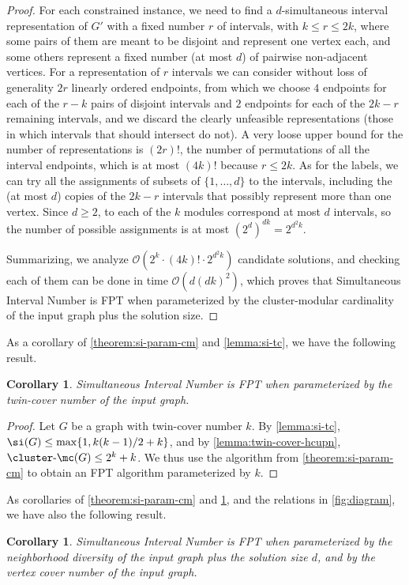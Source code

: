 \documentclass[11pt]{article}
\theoremstyle{plain}
\newtheorem{corollary}[theorem]{Corollary}
\theoremstyle{definition}
\theoremstyle{remark}
\renewcommand{\O}{\mathcal{O}}
\newcommand{\clustermc}{\text{$\cluster$-$\mc$}}
\newcommand{\cm}{\clustermc}
\newcommand{\FPT}{{\smaller[0.83]\textsf{\textup{FPT}}}\xspace}
\begin{document}
\begin{proof}
    For each constrained instance, we need to find a $d$-simultaneous interval representation of $G'$ with a fixed number $r$ of intervals, with $k \leq r \leq 2k$, where some pairs of them are meant to be disjoint and represent one vertex each, and some others represent a fixed number (at most $d$) of pairwise non-adjacent vertices. For a representation of $r$ intervals we can consider without loss of generality $2r$ linearly ordered endpoints, from which we choose $4$ endpoints for each of the $r-k$ pairs of disjoint intervals and $2$ endpoints for each of the $2k-r$ remaining intervals, and we discard the clearly unfeasible representations (those in which intervals that should intersect do not). A very loose upper bound for the number of representations is $(2r)!$, the number of permutations of all the interval endpoints, which is at most $(4k)!$ because $r \leq 2k$. As for the labels, we can try all the assignments of subsets of $\{1, \dots, d\}$ to the intervals, including the (at most $d$) copies of the $2k-r$ intervals that possibly represent more than one vertex. Since $d \geq 2$, to each of the $k$ modules correspond at most $d$ intervals, so the number of possible assignments is at most $(2^d)^{dk} = 2^{d^2k}$.
    
    Summarizing, we analyze $\O(2^k \cdot (4k)! \cdot 2^{d^2k})$ candidate solutions, and checking each of them can be done in time $\O(d(dk)^2)$, which proves that {\sc Simultaneous Interval Number} is \FPT when parameterized by the cluster-modular cardinality of the input graph plus the solution size.
\end{proof}

As a corollary of \cref{theorem:si-param-cm} and \cref{lemma:si-tc}, we have the following result.

\begin{corollary}
    \label{cor:si-param-twin-cover}
    {\sc Simultaneous Interval Number} is \FPT when parameterized by the twin-cover number of the input graph.
\end{corollary}
\begin{proof}
    Let $G$ be a graph with twin-cover number $k$. By \cref{lemma:si-tc}, $\si(G) \leq \max\{1,k(k-1)/2 + k\}$, and by \cref{lemma:twin-cover-hcupn}, $\cm(G) \leq 2^k + k$. We thus use the algorithm from \cref{theorem:si-param-cm} to obtain an \FPT algorithm parameterized by $k$.
\end{proof}

As corollaries of \cref{theorem:si-param-cm} and \cref{cor:si-param-twin-cover}, and the relations in \cref{fig:diagram}, we have also the following result. 
\begin{corollary}
    \label{corol:si-param-nd-vc}
    {\sc Simultaneous Interval Number} is \FPT when parameterized by the neighborhood diversity of the input graph plus the solution size $d$, and by the vertex cover number of the input graph.
\end{corollary}
\end{document}
